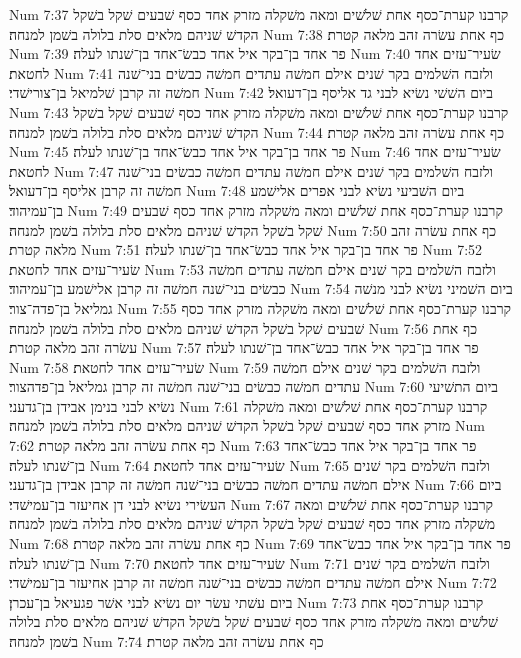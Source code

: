 Num 7:37  קרבנו קערת־כסף אחת שׁלשׁים ומאה משׁקלה מזרק אחד כסף שׁבעים שׁקל בשׁקל הקדשׁ שׁניהם מלאים סלת בלולה בשׁמן למנחה׃
Num 7:38  כף אחת עשׂרה זהב מלאה קטרת׃
Num 7:39  פר אחד בן־בקר איל אחד כבשׂ־אחד בן־שׁנתו לעלה׃
Num 7:40  שׂעיר־עזים אחד לחטאת׃
Num 7:41  ולזבח השׁלמים בקר שׁנים אילם חמשׁה עתדים חמשׁה כבשׂים בני־שׁנה חמשׁה זה קרבן שׁלמיאל בן־צורישׁדי׃
Num 7:42  ביום השׁשׁי נשׂיא לבני גד אליסף בן־דעואל׃
Num 7:43  קרבנו קערת־כסף אחת שׁלשׁים ומאה משׁקלה מזרק אחד כסף שׁבעים שׁקל בשׁקל הקדשׁ שׁניהם מלאים סלת בלולה בשׁמן למנחה׃
Num 7:44  כף אחת עשׂרה זהב מלאה קטרת׃
Num 7:45  פר אחד בן־בקר איל אחד כבשׂ־אחד בן־שׁנתו לעלה׃
Num 7:46  שׂעיר־עזים אחד לחטאת׃
Num 7:47  ולזבח השׁלמים בקר שׁנים אילם חמשׁה עתדים חמשׁה כבשׂים בני־שׁנה חמשׁה זה קרבן אליסף בן־דעואל׃
Num 7:48  ביום השׁביעי נשׂיא לבני אפרים אלישׁמע בן־עמיהוד׃
Num 7:49  קרבנו קערת־כסף אחת שׁלשׁים ומאה משׁקלה מזרק אחד כסף שׁבעים שׁקל בשׁקל הקדשׁ שׁניהם מלאים סלת בלולה בשׁמן למנחה׃
Num 7:50  כף אחת עשׂרה זהב מלאה קטרת׃
Num 7:51  פר אחד בן־בקר איל אחד כבשׂ־אחד בן־שׁנתו לעלה׃
Num 7:52  שׂעיר־עזים אחד לחטאת׃
Num 7:53  ולזבח השׁלמים בקר שׁנים אילם חמשׁה עתדים חמשׁה כבשׂים בני־שׁנה חמשׁה זה קרבן אלישׁמע בן־עמיהוד׃
Num 7:54  ביום השׁמיני נשׂיא לבני מנשׁה גמליאל בן־פדה־צור׃
Num 7:55  קרבנו קערת־כסף אחת שׁלשׁים ומאה משׁקלה מזרק אחד כסף שׁבעים שׁקל בשׁקל הקדשׁ שׁניהם מלאים סלת בלולה בשׁמן למנחה׃
Num 7:56  כף אחת עשׂרה זהב מלאה קטרת׃
Num 7:57  פר אחד בן־בקר איל אחד כבשׂ־אחד בן־שׁנתו לעלה׃
Num 7:58  שׂעיר־עזים אחד לחטאת׃
Num 7:59  ולזבח השׁלמים בקר שׁנים אילם חמשׁה עתדים חמשׁה כבשׂים בני־שׁנה חמשׁה זה קרבן גמליאל בן־פדהצור׃
Num 7:60  ביום התשׁיעי נשׂיא לבני בנימן אבידן בן־גדעני׃
Num 7:61  קרבנו קערת־כסף אחת שׁלשׁים ומאה משׁקלה מזרק אחד כסף שׁבעים שׁקל בשׁקל הקדשׁ שׁניהם מלאים סלת בלולה בשׁמן למנחה׃
Num 7:62  כף אחת עשׂרה זהב מלאה קטרת׃
Num 7:63  פר אחד בן־בקר איל אחד כבשׂ־אחד בן־שׁנתו לעלה׃
Num 7:64  שׂעיר־עזים אחד לחטאת׃
Num 7:65  ולזבח השׁלמים בקר שׁנים אילם חמשׁה עתדים חמשׁה כבשׂים בני־שׁנה חמשׁה זה קרבן אבידן בן־גדעני׃
Num 7:66  ביום העשׂירי נשׂיא לבני דן אחיעזר בן־עמישׁדי׃
Num 7:67  קרבנו קערת־כסף אחת שׁלשׁים ומאה משׁקלה מזרק אחד כסף שׁבעים שׁקל בשׁקל הקדשׁ שׁניהם מלאים סלת בלולה בשׁמן למנחה׃
Num 7:68  כף אחת עשׂרה זהב מלאה קטרת׃
Num 7:69  פר אחד בן־בקר איל אחד כבשׂ־אחד בן־שׁנתו לעלה׃
Num 7:70  שׂעיר־עזים אחד לחטאת׃
Num 7:71  ולזבח השׁלמים בקר שׁנים אילם חמשׁה עתדים חמשׁה כבשׂים בני־שׁנה חמשׁה זה קרבן אחיעזר בן־עמישׁדי׃
Num 7:72  ביום עשׁתי עשׂר יום נשׂיא לבני אשׁר פגעיאל בן־עכרן׃
Num 7:73  קרבנו קערת־כסף אחת שׁלשׁים ומאה משׁקלה מזרק אחד כסף שׁבעים שׁקל בשׁקל הקדשׁ שׁניהם מלאים סלת בלולה בשׁמן למנחה׃
Num 7:74  כף אחת עשׂרה זהב מלאה קטרת׃
